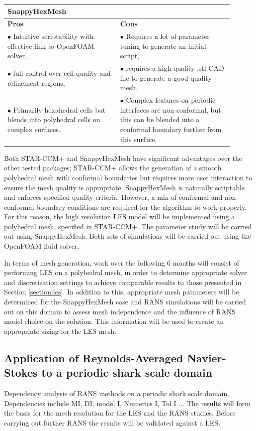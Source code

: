 \documentclass[12pt,oneside,a4paper]{article}
\begin{document}
\begin{table}[!t]
\begin{tabular}{p{0.45\linewidth}p{0.45\linewidth}}
\textbf{SnappyHexMesh}	&	\\
\hline
\textbf{Pros}	&	\textbf{Cons}	\\
$\bullet$	Intuitive scriptability with effective link to OpenFOAM solver,
&
$\bullet$ Requires a lot of parameter tuning to generate an initial script,
\\
$\bullet$	full control over cell quality and refinement regions,
&
$\bullet$ requires a high quality .stl CAD file to generate a good quality mesh.
\\
$\bullet$	Primarily hexahedral cells but blends into polyhedral cells on complex surfaces.
&
$\bullet$	Complex features on periodic interfaces are non-conformal, but this can be blended into a conformal boundary further from this surface,

\end{tabular}
\end{table}

Both STAR-CCM+ and SnappyHexMesh have significant advantages over the other tested packages; STAR-CCM+ allows the generation of a smooth polyhedral mesh with conformal boundaries but requires more user interaction to ensure the mesh quality is appropriate. SnappyHexMesh is naturally scriptable and enforces specified quality criteria. However, a mix of conformal and non-conformal boundary conditions are required for the algorithm to work properly. For this reason, the high resolution LES model will be implemented using a polyhedral mesh, specified in STAR-CCM+. The parameter study will be carried out using SnappyHexMesh. Both sets of simulations will be carried out using the OpenFOAM fluid solver.

In terms of mesh generation, work over the following 6 months will consist of performing LES on a polyhedral mesh, in order to determine appropriate solver and discretisation settings to achieve comparable results to those presented in Section \ref{section:les}. In addition to this, appropriate mesh parameters will be determined for the SnappyHexMesh case and RANS simulations will be carried out on this domain to assess mesh independence and the influence of RANS model choice on the solution. This information will be used to create an appropriate sizing for the LES mesh.

\subsection{Application of Reynolds-Averaged Navier-Stokes to a periodic shark scale domain}
\label{section:rans}
Dependency analysis of RANS methods on a periodic shark scale domain.
Dependencies include MI, DI, model I, Numerics I, Tol I ...
The results will form the basis for the mesh resolution for the LES and the RANS studies. Before carrying out further RANS the results will be validated against a LES. 
\end{document}
